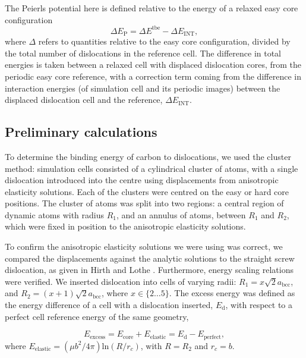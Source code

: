 \documentclass[a4paper,11pt]{article}
\begin{document}
The Peierls potential here is defined relative to the energy of a relaxed easy core configuration
\begin{equation}
 \Delta E_{\text{P}} = \Delta E^{\text{tbe}} - \Delta E_{\text{INT}} ,\label{eq:peierlspot} 
 \end{equation} 
where \(\Delta\) refers to
quantities relative to the easy core configuration, divided by the total number of dislocations
in the reference cell.  The difference in total energies is taken between a relaxed cell with
displaced dislocation cores, from the periodic easy core reference, with a correction term coming
from the difference in interaction energies (of simulation cell and its periodic images) between the displaced
dislocation cell and the reference, \(\Delta E_{\text{INT}}\).




\subsection{Preliminary calculations}
\label{sec:orge99b858}
To determine the binding energy of carbon to dislocations, we used the
cluster method: simulation cells consisted of a cylindrical cluster of
atoms, with a single dislocation introduced into the
centre using displacements from anisotropic elasticity solutions. Each of the clusters
were centred on the easy or hard core positions. The cluster of atoms was
split into two regions: a central region of dynamic atoms with radius \(R_1\),
and an annulus of atoms, between \(R_1\) and \(R_2\), which were fixed in position to the anisotropic
elasticity solutions. 

To confirm the anisotropic elasticity solutions we were using was correct, we compared the
displacements against the analytic solutions to the straight screw dislocation, as given in Hirth
and Lothe \cite{anderson2017theory}. Furthermore, energy scaling relations were verified. We
inserted dislocation into cells of varying radii: \(R_1 = x\sqrt{2}a_{\text{bcc}}\), and \(R_2 =
   (x+1)\sqrt{2}a_{\text{bcc}}\), where \(x \in \{2\dots5\}\). The excess energy
was defined as the energy difference of a cell with a dislocation inserted, \(E_{\text{d}}\), with
respect to a perfect cell reference energy of the same geometry,

\begin{equation}
 E_{\text{excess}} =   E_{\text{core}} + E_{\text{elastic}} = E_{\text{d}} - E_{\text{perfect}}   ,\label{eq:excessenergy}
 \end{equation} 
where
\(E_{\text{elastic}} = ( \mu b^2 / 4\pi )\text{ln}(R/ r_c)\), with \(R = R_2\) and \(r_c = b\).
\end{document}
